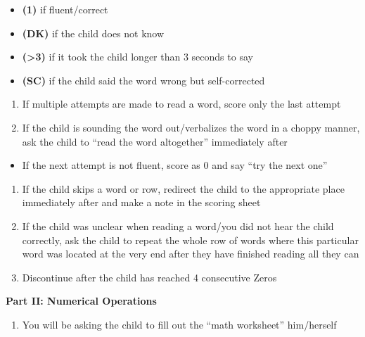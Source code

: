 \documentclass[]{book}
\providecommand{\tightlist}{%
  \setlength{\itemsep}{0pt}\setlength{\parskip}{0pt}}
\begin{document}
\begin{itemize}
\tightlist
\item
  \textbf{(1)} if fluent/correct
\item
  \textbf{(DK)} if the child does not know
\item
  \textbf{(\textgreater{}3)} if it took the child longer than 3 seconds
  to say
\item
  \textbf{(SC)} if the child said the word wrong but self-corrected
\end{itemize}

\begin{enumerate}
\def\labelenumi{\arabic{enumi}.}
\setcounter{enumi}{3}
\tightlist
\item
  If multiple attempts are made to read a word, score only the last
  attempt
\item
  If the child is sounding the word out/verbalizes the word in a choppy
  manner, ask the child to ``read the word altogether'' immediately
  after
\end{enumerate}

\begin{itemize}
\tightlist
\item
  If the next attempt is not fluent, score as 0 and say ``try the next
  one''
\end{itemize}

\begin{enumerate}
\def\labelenumi{\arabic{enumi}.}
\setcounter{enumi}{5}
\tightlist
\item
  If the child skips a word or row, redirect the child to the
  appropriate place immediately after and make a note in the scoring
  sheet
\item
  If the child was unclear when reading a word/you did not hear the
  child correctly, ask the child to repeat the whole row of words where
  this particular word was located at the very end after they have
  finished reading all they can
\item
  Discontinue after the child has reached 4 consecutive Zeros
\end{enumerate}

\textbf{Part II: Numerical Operations}

\begin{enumerate}
\def\labelenumi{\arabic{enumi}.}
\tightlist
\item
  You will be asking the child to fill out the ``math worksheet''
  him/herself
\end{enumerate}
\end{document}
